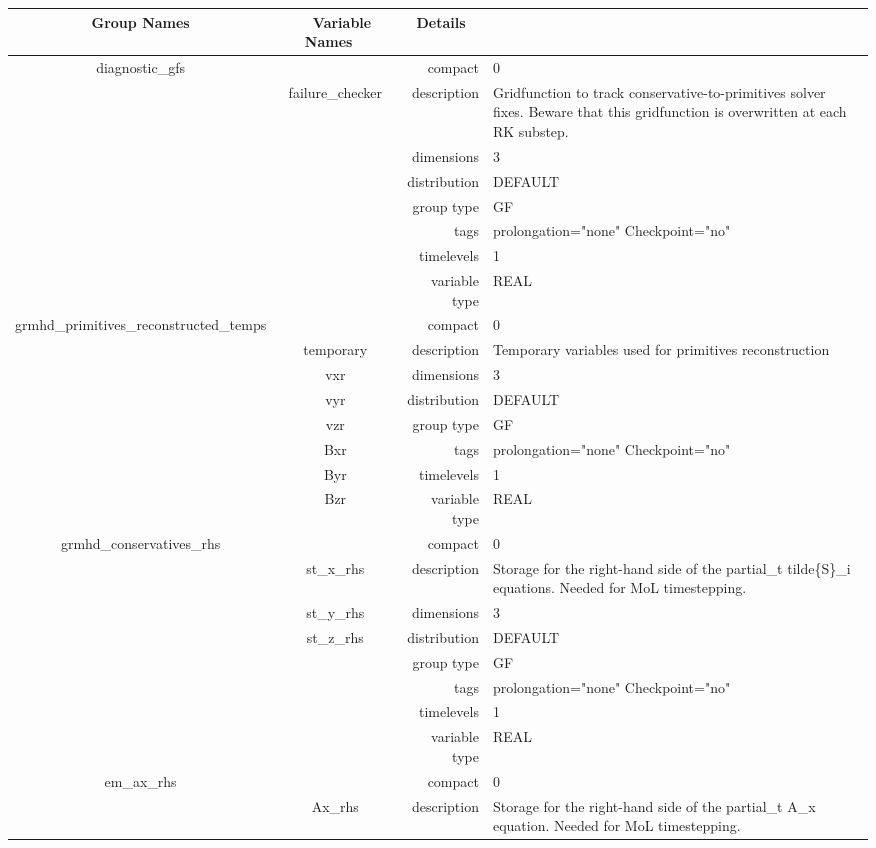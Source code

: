 \vspace{5mm}

\begin{tabular*}{150mm}{|c|c@{\extracolsep{\fill}}|rl|} \hline 
~ {\bf Group Names} ~ & ~ {\bf Variable Names} ~  &{\bf Details} ~ & ~\\ 
\hline 
diagnostic\_gfs &  & compact & 0 \\ 
 & failure\_checker & description & Gridfunction to track conservative-to-primitives solver fixes. Beware that this gridfunction is overwritten at each RK substep. \\ 
 &  & dimensions & 3 \\ 
 &  & distribution & DEFAULT \\ 
 &  & group type & GF \\ 
 &  & tags & prolongation="none" Checkpoint="no" \\ 
 &  & timelevels & 1 \\ 
 &  & variable type & REAL \\ 
\hline 
grmhd\_primitives\_reconstructed\_temps &  & compact & 0 \\ 
 & temporary & description & Temporary variables used for primitives reconstruction \\ 
 & vxr & dimensions & 3 \\ 
 & vyr & distribution & DEFAULT \\ 
 & vzr & group type & GF \\ 
 & Bxr & tags & prolongation="none" Checkpoint="no" \\ 
 & Byr & timelevels & 1 \\ 
 & Bzr & variable type & REAL \\ 
\hline 
grmhd\_conservatives\_rhs &  & compact & 0 \\ 
 & st\_x\_rhs & description & Storage for the right-hand side of the partial\_t tilde\{S\}\_i equations. Needed for MoL timestepping. \\ 
 & st\_y\_rhs & dimensions & 3 \\ 
 & st\_z\_rhs & distribution & DEFAULT \\ 
 &  & group type & GF \\ 
 &  & tags & prolongation="none" Checkpoint="no" \\ 
 &  & timelevels & 1 \\ 
 &  & variable type & REAL \\ 
\hline 
em\_ax\_rhs &  & compact & 0 \\ 
 & Ax\_rhs & description & Storage for the right-hand side of the partial\_t A\_x equation. Needed for MoL timestepping. \\ 

\end{tabular*}
